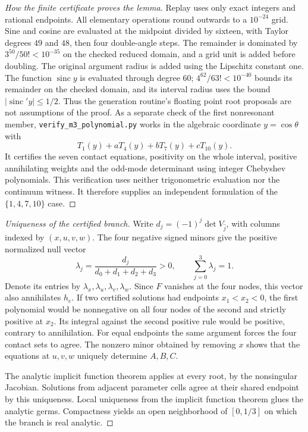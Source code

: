 \begin{proof}[How the finite certificate proves the lemma]
Replay uses only exact integers and rational endpoints. All elementary
operations round outwards to a $10^{-24}$ grid. Sine and cosine are evaluated
at the midpoint divided by sixteen, with Taylor degrees $49$ and $48$,
then four double-angle steps. The remainder is dominated by
$3^{50}/50!<10^{-35}$ on the checked reduced domain, and a grid unit is
added before doubling. The original argument radius is added using the
Lipschitz constant one. The function $\operatorname{sinc} y$ is evaluated
through degree $60$; $4^{62}/63!<10^{-40}$ bounds its remainder on the
checked domain, and its interval radius uses the bound
$|\operatorname{sinc}'y|\le1/2$. Thus the generation routine's floating
point root proposals are not assumptions of the proof.
As a separate check of the first nonresonant member,
\texttt{verify\_m3\_polynomial.py} works in the algebraic coordinate
$y=\cos\theta$ with
\[
 T_1(y)+aT_4(y)+bT_7(y)+cT_{10}(y).
\]
It certifies the seven contact equations, positivity on the whole interval,
positive annihilating weights and the odd-mode determinant using integer
Chebyshev polynomials. This verification uses neither trigonometric
evaluation nor the continuum witness. It therefore supplies an independent
formulation of the $\{1,4,7,10\}$ case.
\end{proof}

\begin{proof}[Uniqueness of the certified branch]
Write $d_j=(-1)^j\det V_{\widehat j}$, with columns indexed by
$(x,u,v,w)$. The four negative signed minors give the positive normalized
null vector
\[
 \lambda_j=\frac{d_j}{d_0+d_1+d_2+d_3}>0,
 \qquad \sum_{j=0}^3\lambda_j=1.
\]
Denote its entries by $\lambda_x,\lambda_u,\lambda_v,\lambda_w$.
Since $F$ vanishes at the four nodes, this vector also annihilates $h_e$.
If two certified solutions had endpoints $x_1<x_2<0$, the first polynomial
would be nonnegative on all four nodes of the second and strictly positive
at $x_2$. Its integral against the second positive rule would be positive,
contrary to annihilation. For equal endpoints the same argument forces the
four contact sets to agree. The nonzero minor obtained by removing $x$
shows that the equations at $u,v,w$ uniquely determine $A,B,C$.

The analytic implicit function theorem applies at every root, by the
nonsingular Jacobian. Solutions from adjacent parameter cells agree at
their shared endpoint by this uniqueness. Local uniqueness from the
implicit function theorem glues the analytic germs. Compactness yields an
open neighborhood of $[0,1/3]$ on which the branch is real analytic.
\end{proof}

